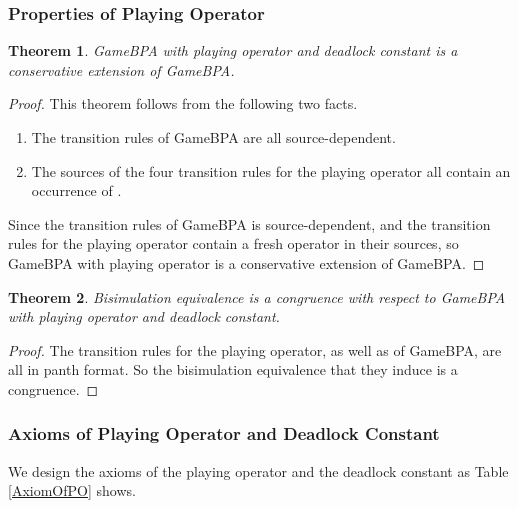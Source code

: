 \documentclass{fac}
\newtheorem{theorem}{Theorem}[section]
\begin{document}
\subsubsection{Properties of Playing Operator}

\begin{theorem}
GameBPA with playing operator and deadlock constant is a conservative extension of GameBPA.
\end{theorem}

\begin{proof}
This theorem follows from the following two facts.

\begin{enumerate}
  \item The transition rules of GameBPA are all source-dependent.
  \item The sources of the four transition rules for the playing operator all contain an occurrence of .
\end{enumerate}

Since the transition rules of GameBPA is source-dependent, and the transition rules for the playing operator contain a fresh operator in their
sources, so GameBPA with playing operator is a conservative extension of GameBPA.
\end{proof}

\begin{theorem}
Bisimulation equivalence is a congruence with respect to GameBPA with playing operator and deadlock constant.
\end{theorem}

\begin{proof}
The transition rules for the playing operator, as well as of GameBPA, are all in panth format. So the bisimulation equivalence that they induce is a congruence.
\end{proof}

\subsubsection{Axioms of Playing Operator and Deadlock Constant}

We design the axioms of the playing operator and the deadlock constant as Table \ref{AxiomOfPO} shows.
\end{document}
